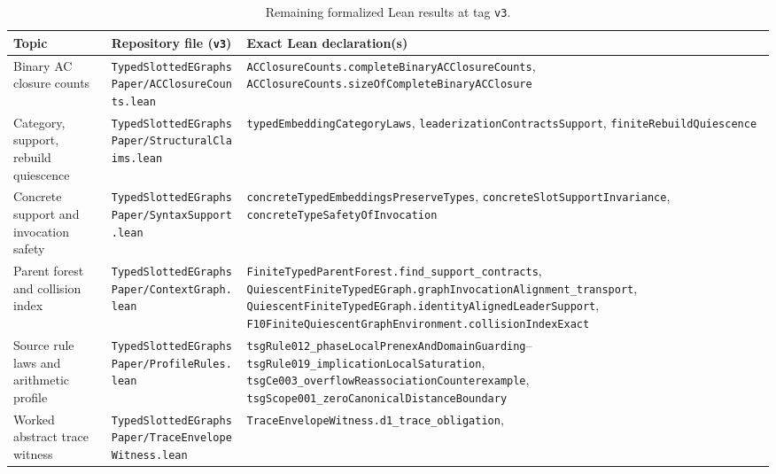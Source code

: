 \begin{table}[ht]
\centering
\caption{Remaining formalized Lean results at tag \texttt{v3}.}
\label{tab:lean-remaining}
\scriptsize
\setlength{\tabcolsep}{2.2pt}
\begin{tabular}{@{}%
>{\raggedright\arraybackslash}p{2.95cm}%
>{\raggedright\arraybackslash}p{3.05cm}%
>{\raggedright\arraybackslash}p{5.75cm}@{}}
\toprule
Topic & Repository file (\texttt{v3}) & Exact Lean declaration(s)\\
\midrule
Binary AC closure counts &
\texttt{TypedSlottedEGraphs\allowbreak Paper/\allowbreak ACClosureCounts.lean} &
\texttt{ACClosureCounts.\allowbreak completeBinary\allowbreak ACClosureCounts},
\texttt{ACClosureCounts.\allowbreak sizeOfComplete\allowbreak BinaryACClosure}\\[3pt]
Category, support, rebuild quiescence &
\texttt{TypedSlottedEGraphs\allowbreak Paper/\allowbreak StructuralClaims.lean} &
\texttt{typedEmbedding\allowbreak CategoryLaws},
\texttt{leaderization\allowbreak ContractsSupport},
\texttt{finiteRebuildQuiescence}\\[3pt]
Concrete support and invocation safety &
\texttt{TypedSlottedEGraphs\allowbreak Paper/\allowbreak SyntaxSupport.lean} &
\texttt{concreteTypedEmbeddings\allowbreak PreserveTypes},
\texttt{concreteSlotSupportInvariance},
\texttt{concreteTypeSafety\allowbreak OfInvocation}\\[3pt]
Parent forest and collision index &
\texttt{TypedSlottedEGraphs\allowbreak Paper/\allowbreak ContextGraph.lean} &
\texttt{FiniteTypedParentForest.\allowbreak find\_\allowbreak support\_\allowbreak contracts},
\texttt{QuiescentFiniteTypedEGraph.\allowbreak graphInvocation\allowbreak Alignment\_\allowbreak transport},
\texttt{QuiescentFiniteTypedEGraph.\allowbreak identityAligned\allowbreak LeaderSupport},
\texttt{F10FiniteQuiescentGraph\allowbreak Environment.\allowbreak collisionIndexExact}\\[3pt]
Source rule laws and arithmetic profile &
\texttt{TypedSlottedEGraphs\allowbreak Paper/\allowbreak ProfileRules.lean} &
\texttt{tsgRule012\_\allowbreak phaseLocalPrenex\allowbreak AndDomainGuarding}--\texttt{tsgRule019\_\allowbreak implicationLocalSaturation},
\texttt{tsgCe003\_\allowbreak overflowReassociation\allowbreak Counterexample},
\texttt{tsgScope001\_\allowbreak zeroCanonical\allowbreak DistanceBoundary}\\[3pt]
Worked abstract trace witness &
\texttt{TypedSlottedEGraphs\allowbreak Paper/\allowbreak TraceEnvelope\allowbreak Witness.lean} &
\texttt{TraceEnvelopeWitness.\allowbreak d1\_\allowbreak trace\_\allowbreak obligation},

\end{tabular}
\end{table}
